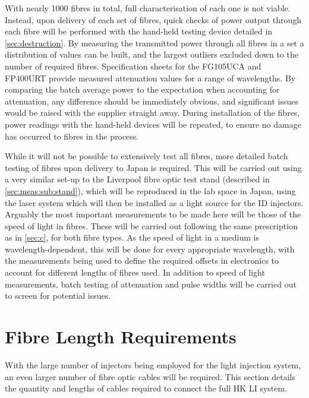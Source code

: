 \documentclass[a4paper,11pt]{article}
\begin{document}
With nearly 1000 fibres in total, full characterisation of each one is not viable. Instead, upon delivery of each set of fibres, quick checks of power output through each fibre will be performed with the hand-held testing device detailed in \cref{sec:destruction}. By measuring the transmitted power through all fibres in a set a distribution of values can be built, and the largest outliers excluded down to the number of required fibres. Specification sheets for the FG105UCA \cite{bib:fg105uca} and FP400URT \cite{bib:fp400urt} provide measured attenuation values for a range of wavelengths. By comparing the batch average power to the expectation when accounting for attenuation, any difference should be immediately obvious, and significant issues would be raised with the supplier straight away. During installation of the fibres, power readings with the hand-held devices will be repeated, to ensure no damage has occurred to fibres in the process.

While it will not be possible to extensively test all fibres, more detailed batch testing of fibres upon delivery to Japan is required. This will be carried out using a very similar set-up to the Liverpool fibre optic test stand (described in \cref{sec:meas:sub:stand}), which will be reproduced in the lab space in Japan, using the laser system which will then be installed as a light source for the ID injectors. Arguably the most important measurements to be made here will be those of the speed of light in fibres. These will be carried out following the same prescription as in \cref{sec:c}, for both fibre types. As the speed of light in a medium is wavelength-dependent, this will be done for every appropriate wavelength, with the measurements being used to define the required offsets in electronics to account for different lengths of fibres used. In addition to speed of light measurements, batch testing of attenuation and pulse widths will be carried out to screen for potential issues.


\section{Fibre Length Requirements}\label{sec:lengths}

With the large number of injectors being employed for the light injection system, an even larger number of fibre optic cables will be required. This section details the quantity and lengths of cables required to connect the full HK LI system.
\end{document}

